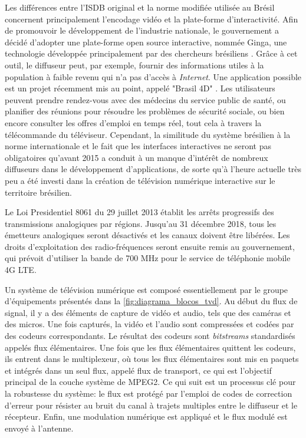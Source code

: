 \documentclass[12pt,a4paper]{article}
\begin{document}
Les différences entre l'ISDB original et la norme modifiée utilisée au Brésil concernent principalement l'encodage vidéo et la plate-forme d'interactivité. Afin de promouvoir le développement de l'industrie nationale, le gouvernement a décidé d'adopter une plate-forme open source interactive, nommée Ginga, une technologie développée principalement par des chercheurs brésiliens \cite{PUCRJ}. Grâce à cet outil, le diffuseur peut, par exemple, fournir des informations utiles à la population à faible revenu qui n'a pas d'accès à \textit{Internet}. Une application possible est un projet récemment mis au point, appelé "Brasil 4D" \cite{consultas}. Les utilisateurs peuvent prendre rendez-vous avec des médecins du service public de santé, ou planifier des réunions pour résoudre les problèmes de sécurité sociale, ou bien encore consulter les offres d'emploi en temps réel, tout cela à travers la télécommande du téléviseur. Cependant, la similitude du système brésilien à la norme internationale et le fait que les interfaces interactives ne seront pas obligatoires qu'avant 2015 a conduit à un manque d'intérêt de nombreux diffuseurs dans le développement d'applications, de sorte qu'à l'heure actuelle très peu a été investi dans la création de télévision numérique interactive sur le territoire brésilien.

Le Loi Presidentiel 8061 \cite{decreto8061} du 29 juillet 2013 établit les arrêts progressifs des transmissions analogiques par régions. Jusqu'au 31 décembre 2018, tous les émetteurs analogiques seront désactivés et les canaux doivent être libérées. Les droits d'exploitation des radio-fréquences seront ensuite remis au gouvernement, qui prévoit d'utiliser la bande de 700 MHz pour le service de téléphonie mobile 4G LTE.

Un système de télévision numérique est composé essentiellement par le groupe d'équipements présentés dans la \autoref{fig:diagrama_blocos_tvd}. Au début du flux de signal, il y a des éléments de capture de vidéo et audio, tels que des caméras et des micros. Une fois capturés, la vidéo et l'audio sont compressées et codées par des codeurs correspondants. Le résultat des codeurs sont \textit{bitstreams} standardisés appelés flux élémentaires. Une fois que les flux élémentaires quittent les codeurs, ils entrent dans le multiplexeur, où tous les flux élémentaires sont mis en paquets et intégrés dans un seul flux, appelé flux de transport, ce qui est l'objectif principal de la couche système de MPEG2. Ce qui suit est un processus clé pour la robustesse du système: le flux est protégé par l'emploi de codes de correction d'erreur pour résister au bruit du canal à trajets multiples entre le diffuseur et le récepteur. Enfin, une modulation numérique est appliqué et le flux modulé est envoyé à l'antenne.
\end{document}
